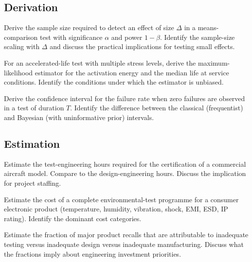 \subsection*{Derivation}

\begin{exercise}
Derive the sample size required to detect an effect of size $\Delta$ in a means-comparison test with significance $\alpha$ and power $1-\beta$. Identify the sample-size scaling with $\Delta$ and discuss the practical implications for testing small effects.
\end{exercise}

\begin{exercise}
For an accelerated-life test with multiple stress levels, derive the maximum-likelihood estimator for the activation energy and the median life at service conditions. Identify the conditions under which the estimator is unbiased.
\end{exercise}

\begin{exercise}
Derive the confidence interval for the failure rate when zero failures are observed in a test of duration $T$. Identify the difference between the classical (frequentist) and Bayesian (with uninformative prior) intervals.
\end{exercise}

\subsection*{Estimation}

\begin{exercise}
Estimate the test-engineering hours required for the certification of a commercial aircraft model. Compare to the design-engineering hours. Discuss the implication for project staffing.
\end{exercise}

\begin{exercise}
Estimate the cost of a complete environmental-test programme for a consumer electronic product (temperature, humidity, vibration, shock, EMI, ESD, IP rating). Identify the dominant cost categories.
\end{exercise}

\begin{exercise}
Estimate the fraction of major product recalls that are attributable to inadequate testing versus inadequate design versus inadequate manufacturing. Discuss what the fractions imply about engineering investment priorities.
\end{exercise}

